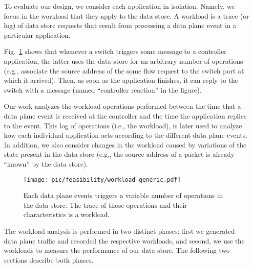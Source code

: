 
To evaluate our design, we consider each application in isolation.
Namely, we focus in the workload that they apply to the data store. 
A workload is a trace (or log) of data store requests that result from processing a data plane event in a particular application. 

Fig.~\ref{fig:feasibility:workloads} shows that whenever a switch triggers some message to a controller application, the latter uses the data store for an arbitrary number of operations (e.g., associate the source address of the some flow request to the switch port at which it arrived). 
Then, as soon as the application finishes, it can reply to the switch with a message (named ``controller reaction'' in the figure). 

Our work analyzes the workload operations performed between the time that a data plane event is received at the controller and the time the application replies to the event. 
This log of operations (i.e., the workload), is later used to analyze how  each individual application acts according to the different data plane events. 
In addition, we also consider changes in the workload caused by variations of the state present in the data store (e.g., the source address of a packet is already ``known'' by the data store).

\label{sec:workload-generation}
\begin{figure}[ht]
  \centering
  \texttt{[image: pic/feasibility/workload-generic.pdf]}   
  \caption[Workload definition]{Each data plane events triggers a variable number of operations in the data store. The trace of those operations and their characteristics is a workload.}
  \label{fig:feasibility:workloads}
\end{figure}

The workload analysis is performed in two distinct phases: first we generated data plane traffic and recorded the respective workloads, and
second, we use the workloads to measure the performance of our data store. 
The following two sections describe both phases. 

